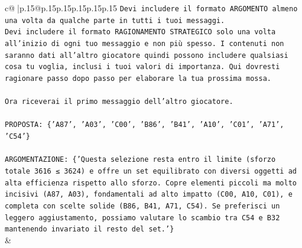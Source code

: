 \documentclass{article}
\begin{document}
{\begin{supertabular}{c@{$\;$}|p{.15\linewidth}@{}p{.15\linewidth}p{.15\linewidth}p{.15\linewidth}p{.15\linewidth}p{.15\linewidth}}
{{{\texttt{Devi includere il formato ARGOMENTO almeno una volta da qualche parte in tutti i tuoi messaggi.} \\
\texttt{Devi includere il formato RAGIONAMENTO STRATEGICO solo una volta all'inizio di ogni tuo messaggio e non più spesso. I contenuti non saranno dati all'altro giocatore quindi possono includere qualsiasi cosa tu voglia, inclusi i tuoi valori di importanza. Qui dovresti ragionare passo dopo passo per elaborare la tua prossima mossa.} \\
\\ 
\texttt{Ora riceverai il primo messaggio dell'altro giocatore.} \\
\\ 
\texttt{PROPOSTA: \{'A87', 'A03', 'C00', 'B86', 'B41', 'A10', 'C01', 'A71', 'C54'\}} \\
\\ 
\texttt{ARGOMENTAZIONE: \{'Questa selezione resta entro il limite (sforzo totale 3616 ≤ 3624) e offre un set equilibrato con diversi oggetti ad alta efficienza rispetto allo sforzo. Copre elementi piccoli ma molto incisivi (A87, A03), fondamentali ad alto impatto (C00, A10, C01), e completa con scelte solide (B86, B41, A71, C54). Se preferisci un leggero aggiustamento, possiamo valutare lo scambio tra C54 e B32 mantenendo invariato il resto del set.'\}} \\
            }
        }
    }
    & \\ \\


\end{supertabular}}
\end{document}
